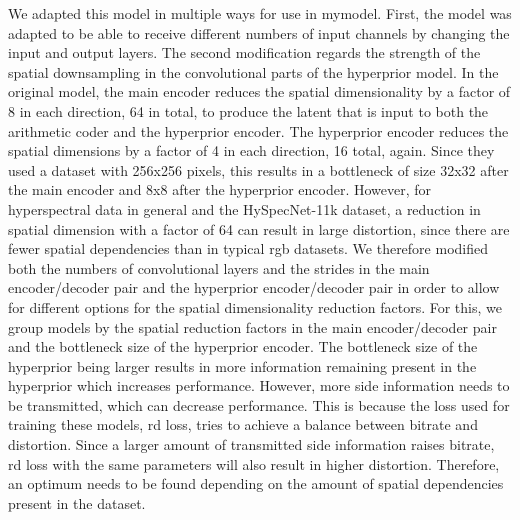 We adapted this model in multiple ways for use in \ac{mymodel}. First, the model was adapted to be able to receive different numbers of input channels by changing the input and output layers. The second modification regards the strength of the spatial downsampling in the convolutional parts of the hyperprior model. In the original model, the main encoder reduces the spatial dimensionality by a factor of 8 in each direction, 64 in total, to produce the latent that is input to both the arithmetic coder and the hyperprior encoder. The hyperprior encoder reduces the spatial dimensions by a factor of 4 in each direction, 16  total, again. Since they used a dataset with 256x256 pixels, this results in a bottleneck of size 32x32 after the main encoder and 8x8 after the hyperprior encoder. However, for hyperspectral data in general and the HySpecNet-11k dataset, a reduction in spatial dimension with a factor of 64 can result in large distortion, since there are fewer spatial dependencies than in typical \ac{rgb} datasets. We therefore modified both the numbers of convolutional layers and the strides in the main encoder/decoder pair and the hyperprior encoder/decoder pair in order to allow for different options for the spatial dimensionality reduction factors. For this, we group models by the spatial reduction factors in the main encoder/decoder pair and the bottleneck size of the hyperprior encoder. The bottleneck size of the hyperprior being larger results in more information remaining present in the hyperprior which increases performance. However, more side information needs to be transmitted, which can decrease performance. This is because the loss used for training these models, \ac{rd} loss, tries to achieve a balance between bitrate and distortion. Since a larger amount of transmitted side information raises bitrate, \ac{rd} loss with the same parameters will also result in higher distortion. Therefore, an optimum needs to be found depending on the amount of spatial dependencies present in the dataset.
